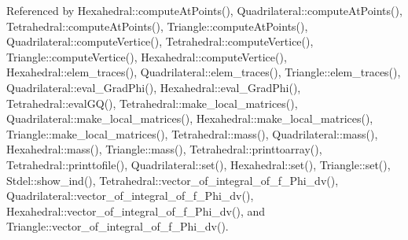 Referenced by Hexahedral\+::compute\+At\+Points(), Quadrilateral\+::compute\+At\+Points(), Tetrahedral\+::compute\+At\+Points(), Triangle\+::compute\+At\+Points(), Quadrilateral\+::compute\+Vertice(), Tetrahedral\+::compute\+Vertice(), Triangle\+::compute\+Vertice(), Hexahedral\+::compute\+Vertice(), Hexahedral\+::elem\+\_\+traces(), Quadrilateral\+::elem\+\_\+traces(), Triangle\+::elem\+\_\+traces(), Quadrilateral\+::eval\+\_\+\+Grad\+Phi(), Hexahedral\+::eval\+\_\+\+Grad\+Phi(), Tetrahedral\+::eval\+G\+Q(), Tetrahedral\+::make\+\_\+local\+\_\+matrices(), Quadrilateral\+::make\+\_\+local\+\_\+matrices(), Hexahedral\+::make\+\_\+local\+\_\+matrices(), Triangle\+::make\+\_\+local\+\_\+matrices(), Tetrahedral\+::mass(), Quadrilateral\+::mass(), Hexahedral\+::mass(), Triangle\+::mass(), Tetrahedral\+::printtoarray(), Tetrahedral\+::printtofile(), Quadrilateral\+::set(), Hexahedral\+::set(), Triangle\+::set(), Stdel\+::show\+\_\+ind(), Tetrahedral\+::vector\+\_\+of\+\_\+integral\+\_\+of\+\_\+f\+\_\+\+Phi\+\_\+dv(), Quadrilateral\+::vector\+\_\+of\+\_\+integral\+\_\+of\+\_\+f\+\_\+\+Phi\+\_\+dv(), Hexahedral\+::vector\+\_\+of\+\_\+integral\+\_\+of\+\_\+f\+\_\+\+Phi\+\_\+dv(), and Triangle\+::vector\+\_\+of\+\_\+integral\+\_\+of\+\_\+f\+\_\+\+Phi\+\_\+dv().

